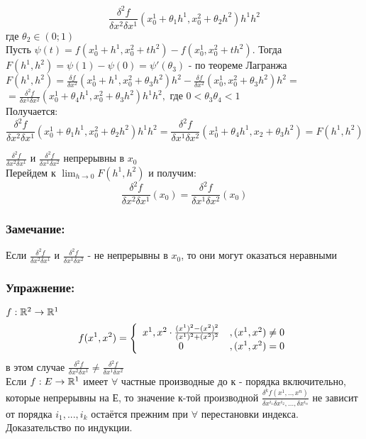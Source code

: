 	$$
	\frac{\delta^2 f}{\delta x^2 \delta x^1}(x_0^1+\theta_1 h^1,x_0^2+\theta_2 h^2)h^1 h^2
	$$
	где $\theta_2\in(0;1)$
	\\
	Пусть $\psi(t) = f(x_0^1+h^1, x_0^2+th^2) - f(x_0^1,x_0^2+th^2).$ Тогда
	\\
	$F(h^1,h^2)=\psi(1)-\psi(0) = \psi'(\theta_3)$ - по теореме Лагранжа
	\\
	$F(h^1,h^2) = \frac{\delta f}{\delta x^2}(x_0^1+h^1,x_0^2+\theta_3 h^2)h^2 - \frac{\delta f}{\delta x^2}(x_0^1,x_0^2+\theta_3 h^2)h^2 = $
	\\
	$ = \frac{\delta^2 f}{\delta x^1 \delta x^2}(x_0^1+\theta_4 h^1,x_0^2+\theta_3 h^2)h^1 h^2,$
	где $0<\theta_3\theta_4<1$
	\\
	Получается:
	$$
	\frac{\delta^2 f}{\delta x^2 \delta x^1}(x_0^1+\theta_1 h^1,x_0^2+\theta_2 h^2)h^1 h^2 = \frac{\delta^2 f}{\delta x^1 \delta x^2}(x_0^1+\theta_4 h^1, x_2+\theta_3 h^2) = F(h^1,h^2)
	$$
	
	$\frac{\delta^2 f}{\delta x^2 \delta x^1}$ и $\frac{\delta^2 f}{\delta x^1 \delta x^2}$ непрерывны в $x_0$
	\\
	Перейдем к $\lim_{h\to 0} F(h^1,h^2)$ и получим:
	$$
	\frac{\delta^2 f}{\delta x^2 \delta x^1}(x_0) =\frac{\delta^2 f}{\delta x^1 \delta x^2}(x_0) 
	$$
	\dokno
	
	\subsubsection{Замечание:}
	Если $\frac{\delta^2 f}{\delta x^2 \delta x^1}$ и $\frac{\delta^2 f}{\delta x^1 \delta x^2}$ - не непрерывны в $x_0$, то они могут оказаться неравными
	
	\subsubsection{Упражнение:}
	$f:\mathbb{R}^2\to\mathbb{R}^1$ 
	\\
	$$
	f(x^1,x^2)=\left\{\begin{array}{c c}
	x^1,x^2\cdot\frac{(x^1)^2 - (x^2)^2}{(x^1)^2+(x^2)^2} & ,(x^1,x^2)\ne 0 \\
	0 & ,(x^1,x^2)=0
	\end{array}\right.
	$$
	в этом случае $\frac{\delta^2 f}{\delta x^2 \delta x^1} \ne \frac{\delta^2 f}{\delta x^1 \delta x^2}$
	\\
	Если $f:E\to\mathbb{R}^1$ имеет $\forall$ частные производные до к - порядка включительно, которые непрерывны на Е, то значение к-той производной $\frac{\delta^k f(x^1,..,x^n)}{\delta x^{i_1} \delta x^{i_2},...,\delta x^{i_n}}$ не зависит от порядка $i_1,...,i_k$ остаётся прежним при $\forall$ перестановки индекса.
	Доказательство по индукции.